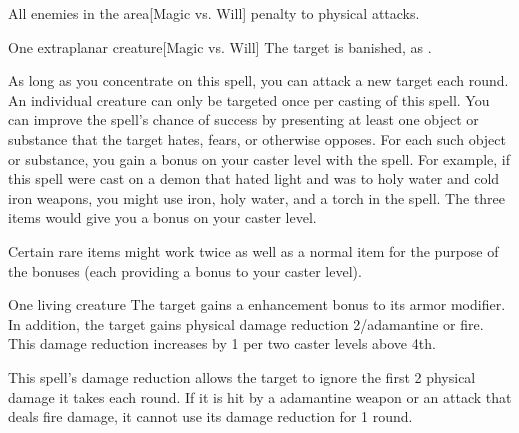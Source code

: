 \begin{comment}
\subsubsection{B}
\end{comment}

\begin{spelltargets}{All enemies in the area}[Magic vs. Will]
    \spellsuccess {} penalty to physical attacks.
\end{spelltargets}

\spellrng{\rngmed}
\begin{spelltargets}{One extraplanar creature}[Magic vs. Will]
    \spellsuccess The target is banished, as .
\end{spelltargets}
\spelleffect As long as you concentrate on this spell, you can attack a new target each round. An individual creature can only be targeted once per casting of this spell.
\spellnotes You can improve the spell's chance of success by presenting at least one object or substance that the target hates, fears, or otherwise opposes. For each such object or substance, you gain a  bonus on your caster level with the spell. For example, if this spell were cast on a demon that hated light and was \vulnerable to holy water and cold iron weapons, you might use iron, holy water, and a torch in the spell. The three items would give you a  bonus on your caster level. 
\par Certain rare items might work twice as well as a normal item for the purpose of the bonuses (each providing a  bonus to your caster level).

\spelldur{\durshort}
\begin{spelltarget}{One living creature}
    \spelleffect The target gains a  enhancement bonus to its armor modifier. \spellbonusscalingdescription In addition, the target gains physical damage reduction 2/adamantine or fire. This damage reduction increases by 1 per two caster levels above 4th.
\end{spelltarget}
\spellnotes This spell's damage reduction allows the target to ignore the first 2 physical damage it takes each round. If it is hit by a adamantine weapon or an attack that deals fire damage, it cannot use its damage reduction for 1 round.

